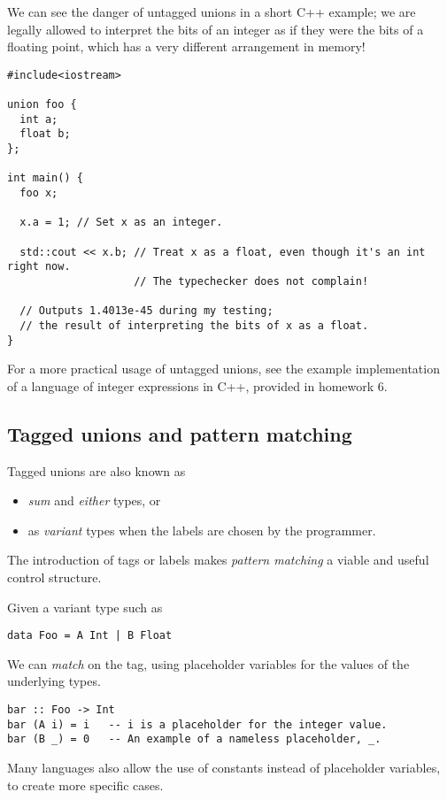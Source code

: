 \documentclass[11pt]{article}
\theoremstyle{definition}
\begin{document}
We can see the danger of untagged unions in a short C++ example;
we are legally allowed to interpret the bits of an integer
as if they were the bits of a floating point,
which has a very different arrangement in memory!
\begin{verbatim}
#include<iostream>

union foo {
  int a;
  float b;
};

int main() {
  foo x;

  x.a = 1; // Set x as an integer.
  
  std::cout << x.b; // Treat x as a float, even though it's an int right now.
                    // The typechecker does not complain!
  
  // Outputs 1.4013e-45 during my testing;
  // the result of interpreting the bits of x as a float.
}
\end{verbatim}

For a more practical usage of untagged unions, see the example
implementation of a language of integer expressions in C++,
provided in homework 6.

\subsection{Tagged unions and pattern matching}
\label{sec:orgd7ab20b}

Tagged unions are also known as
\begin{itemize}
\item \emph{sum} and \emph{either} types, or
\item as \emph{variant} types when the labels are chosen by the programmer.
\end{itemize}

The introduction of tags or labels makes \emph{pattern matching} a viable
and useful control structure.

Given a variant type such as
\begin{verbatim}
data Foo = A Int | B Float
\end{verbatim}

We can \emph{match} on the tag, using placeholder variables
for the values of the underlying types.
\begin{verbatim}
bar :: Foo -> Int
bar (A i) = i   -- i is a placeholder for the integer value.
bar (B _) = 0   -- An example of a nameless placeholder, _.
\end{verbatim}
Many languages also allow the use of constants
instead of placeholder variables, to create more specific cases.
\end{document}
